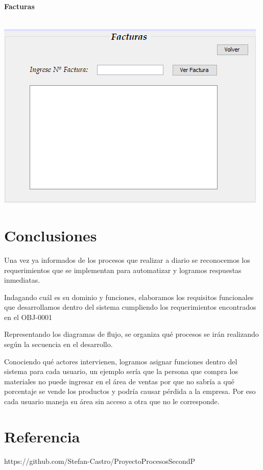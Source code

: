 \documentclass[12pt,a4paper]{article}
\begin{document}
 \par\vspace{2cm}
\textbf {Facturas}\\\\
\begin{center}
 \includegraphics[scale=0.7]{Facturas.png} 
 \end{center}

\section{Conclusiones}\textbf{}
Una vez ya informados de los procesos que realizar a diario se reconocemos los requerimientos que se implementan para automatizar y logramos respuestas inmediatas.

Indagando cuál es su dominio y funciones, elaboramos los requisitos funcionales que desarrollamos dentro del sistema cumpliendo los requerimientos encontrados en el OBJ-0001

Representando los diagramas de flujo, se organiza qué procesos se irán realizando según la secuencia en el desarrollo. 

Conociendo qué actores intervienen, logramos asignar funciones dentro del sistema para cada usuario, un ejemplo sería que la persona que compra los materiales no puede ingresar en el área de ventas por que no sabría a qué porcentaje se vende los productos y podría causar pérdida a la empresa. Por eso cada usuario maneja su área sin acceso a otra que no le corresponde.  

 \par\vspace{6cm}\section{Referencia}\textbf{}
https://github.com/Stefan-Castro/ProyectoProcesosSecondP
\end{document}
